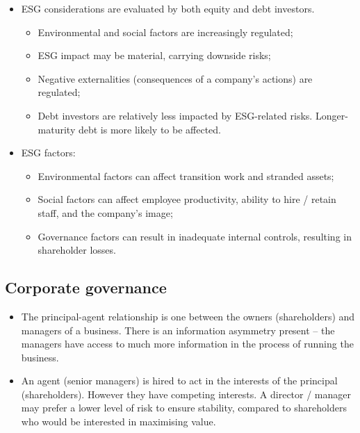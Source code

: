 \documentclass[../notes_compiled.tex]{subfiles}
\begin{document}
\begin{itemize}
\item ESG considerations are evaluated by both equity and debt investors.
\begin{itemize}
\item Environmental and social factors are increasingly regulated;
\item ESG impact may be material, carrying downside risks;
\item Negative externalities (consequences of a company's actions) are regulated;
\item Debt investors are relatively less impacted by ESG-related risks. Longer-maturity debt is more likely to be affected.
\end{itemize}
\item ESG factors:
\begin{itemize}
\item Environmental factors can affect transition work and stranded assets;
\item Social factors can affect employee productivity, ability to hire / retain staff, and the company's image;
\item Governance factors can result in inadequate internal controls, resulting in shareholder losses.
\end{itemize}
\end{itemize}

\subsection{Corporate governance}
\begin{itemize}
\item The principal-agent relationship is one between the owners (shareholders) and managers of a business. There is an information asymmetry present -- the managers have access to much more information in the process of running the business. 
\item An agent (senior managers) is hired to act in the interests of the principal (shareholders). However they have competing interests. A director / manager may prefer a lower level of risk to ensure stability, compared to shareholders who would be interested in maximising value.
\end{itemize}
\end{document}
